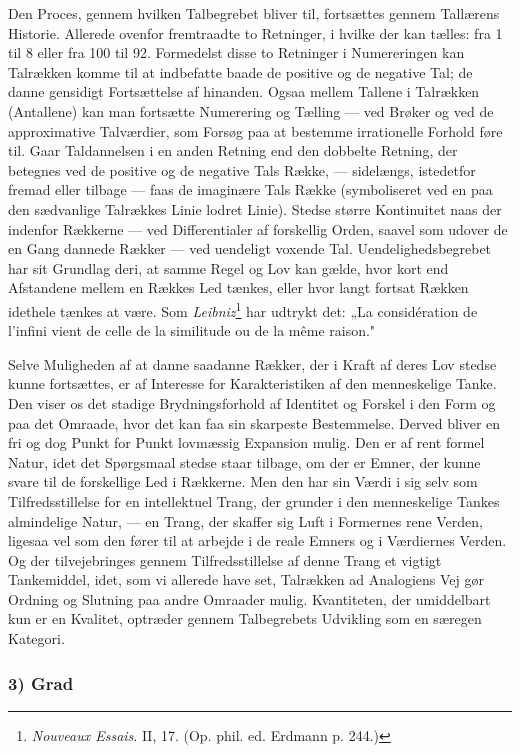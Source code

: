 \documentclass[12pt,a4paper]{book}
\newcommand{\apage}[1]{\marginnote{\footnotesize\textit{[#1]}}}
\begin{document}
Den Proces, gennem hvilken Talbegrebet bliver til, fortsættes gennem
Tallærens Historie. Allerede ovenfor fremtraadte to Retninger, i hvilke
der kan tælles: fra 1 til 8 eller fra 100 til 92. Formedelst disse to
Retninger i Numereringen kan Talrækken komme til at indbefatte baade de
positive og de negative Tal; de danne gensidigt Fortsættelse af
hinanden. Ogsaa mellem Tallene i Talrækken (Antallene) kan man
fortsætte Numerering og Tælling --- ved Brøker og ved de approximative
Talværdier, som Forsøg paa at bestemme irrationelle Forhold føre til.
Gaar Taldannelsen i en anden Retning end den dobbelte Retning, der
betegnes ved de positive og de negative Tals Række, --- sidelængs,
istedetfor \apage{193} fremad eller tilbage --- faas de imaginære Tals Række
(symboliseret ved en paa den sædvanlige Talrækkes Linie lodret Linie).
Stedse større Kontinuitet naas der indenfor Rækkerne --- ved
Differentialer af forskellig Orden, saavel som udover de en Gang
dannede Rækker --- ved uendeligt voxende Tal. Uendelighedsbegrebet har
sit Grundlag deri, at samme Regel og Lov kan gælde, hvor kort end Afstandene mellem en Rækkes Led tænkes, eller hvor langt fortsat Rækken
idethele tænkes at være. Som \emph{Leibniz}\footnote{\emph{Nouveaux
Essais}. II, 17. (Op. phil. ed. Erdmann p. 244.)} har udtrykt det: „La
considération de l'infini vient de celle de la similitude ou de la même
raison."

Selve Muligheden af at danne saadanne Rækker, der i Kraft af deres Lov
stedse kunne fortsættes, er af Interesse for Karakteristiken af den
menneskelige Tanke. Den viser os det stadige Brydningsforhold af
Identitet og Forskel i den Form og paa det Omraade, hvor det kan
faa sin skarpeste Bestemmelse. Derved bliver en fri og dog Punkt for
Punkt lovmæssig Expansion mulig. Den er af rent formel Natur, idet det
Spørgsmaal stedse staar tilbage, om der er Emner, der kunne svare til de
forskellige Led i Rækkerne. Men den har sin Værdi i sig selv som
Tilfredsstillelse for en intellektuel Trang, der grunder i den
menneskelige Tankes almindelige Natur, --- en Trang, der skaffer sig
Luft i Formernes rene Verden, ligesaa vel som den fører til at arbejde i
de reale Emners og i Værdiernes Verden. Og der tilvejebringes gennem
Tilfredsstillelse af denne Trang et vigtigt Tankemiddel, idet, som vi
allerede have set, Talrækken ad Analogiens Vej gør Ordning og Slutning
paa andre Omraader mulig. Kvantiteten, der umiddelbart kun er en
Kvalitet, optræder gennem Talbegrebets Udvikling som en særegen
Kategori.

\subsubsection*{3) Grad}
\end{document}
